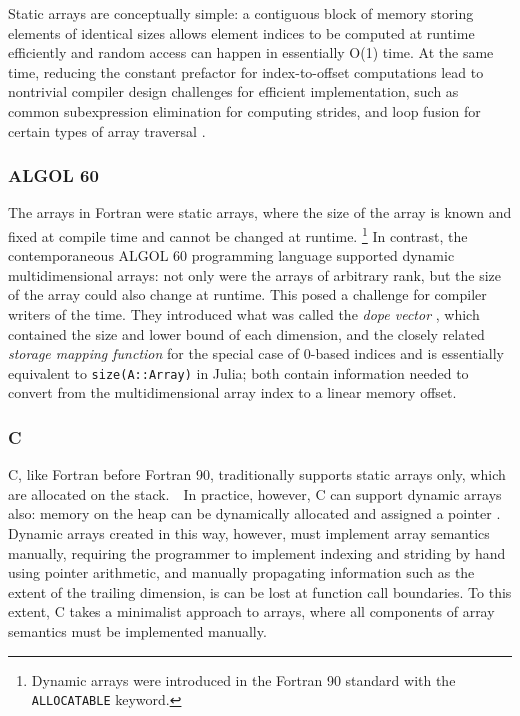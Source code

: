 \documentclass[preprint]{sigplanconf}
\newcommand{\ALGOL}{A\textsc{LGOL}}
\newcommand{\code}[1]{\texttt{#1}}
\begin{document}

Static arrays are conceptually simple: a contiguous block of memory storing
elements of identical sizes allows element indices to be computed at runtime
efficiently and random access can happen in essentially O(1) time. At the same
time, reducing the constant prefactor for index-to-offset computations lead to
nontrivial compiler design challenges for efficient implementation, such as
common subexpression elimination for computing strides, and loop fusion for
certain types of array traversal \cite{Busam:1969oe}.


\subsubsection{ALGOL 60}

The arrays in Fortran were static arrays, where the size of the array is known
and fixed at compile time and cannot be changed at runtime. \footnote{Dynamic
arrays were introduced in the Fortran 90 standard with the \code{ALLOCATABLE}
keyword.} In contrast, the contemporaneous \ALGOL{} 60 programming language
supported dynamic multidimensional arrays: not only were the arrays of
arbitrary rank, but the size of the array could also change at runtime. This
posed a challenge for compiler writers of the time. They introduced what was
called the \textit{dope vector} \cite{Sattley:1960as, Sattley:1961as}, which
contained the size and lower bound of each dimension, and the closely related
\textit{storage mapping function} \cite[pp.~80--87]{Randell:1964a6} for the
special case of 0-based indices and is essentially equivalent to
\code{size(A::Array)} in Julia; both contain information needed to convert
from the multidimensional array index to a linear memory offset.

\subsubsection{C}

C, like Fortran before Fortran 90, traditionally supports static arrays only,
which are allocated on the stack.　In practice, however, C can support dynamic
arrays also: memory on the heap can be dynamically allocated and assigned a
pointer \cite{Kernigham:1978cp}. Dynamic arrays created in this way, however,
must implement array semantics manually, requiring the programmer to implement
indexing and striding by hand using pointer arithmetic, and manually
propagating information such as the extent of the trailing dimension, is can
be lost at function call boundaries. To this extent, C takes a minimalist
approach to arrays, where all components of array semantics must be
implemented manually.
\end{document}
